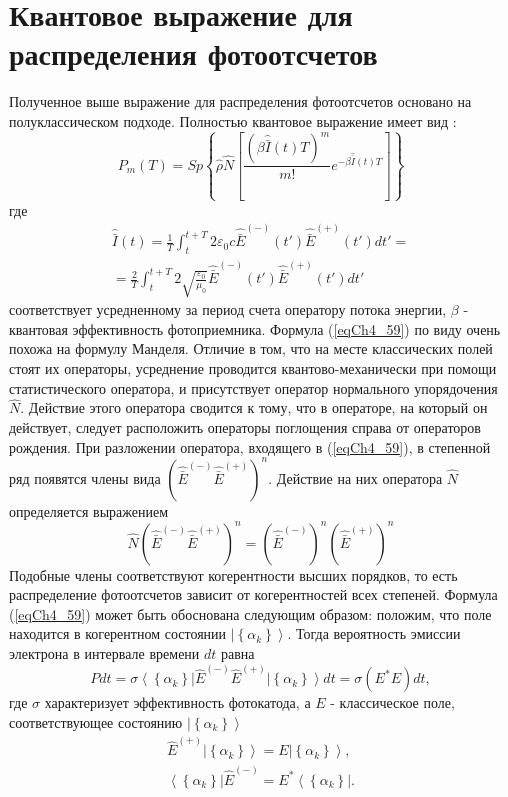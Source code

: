 \section{Квантовое выражение для распределения фотоотсчетов}
Полученное выше выражение для распределения фотоотсчетов основано на
полуклассическом подходе. Полностью квантовое выражение имеет
вид \cite{bLoudon1976}: 
\begin{equation}
P_m\left(T\right) = Sp \left\{
\hat{\rho}\hat{N}
\left[
\frac{\left(\beta \hat{\bar{I}}\left(t\right) T\right)^m}{m!}
e^{- \beta \hat{\bar{I}}\left(t\right) T}
\right]
\right\} 
\label{eqCh4_59}
\end{equation}
где
\begin{eqnarray}
\hat{\bar{I}}\left(t\right) = \frac{1}{T}\int_t^{t + T}2
\varepsilon_0 c \hat{\bar{E}}^{(-)}\left(t'\right)
\hat{\bar{E}}^{(+)}\left(t'\right)dt' =
\nonumber \\
= \frac{2}{T}\int_t^{t + T}2
\sqrt{\frac{\varepsilon_0}{\mu_0}} \hat{\bar{E}}^{(-)}\left(t'\right)
\hat{\bar{E}}^{(+)}\left(t'\right)dt'
\nonumber
\end{eqnarray}
соответствует усредненному за период счета оператору потока энергии,
$\beta$ - квантовая эффективность фотоприемника. Формула
(\ref{eqCh4_59}) по виду очень 
похожа на формулу Манделя. Отличие в том, что на месте классических
полей стоят их операторы, усреднение проводится квантово-механически
при помощи статистического оператора, и присутствует оператор
нормального упорядочения $\hat{N}$.  Действие этого оператора сводится
к тому, что в операторе, на который он действует, следует расположить 
операторы поглощения справа от операторов рождения. При разложении
оператора, входящего в (\ref{eqCh4_59}), в степенной ряд появятся
члены вида  $\left(\hat{\bar{E}}^{(-)}\hat{\bar{E}}^{(+)}\right)^n$.  
Действие на них оператора $\hat{N}$  определяется выражением 
\[
\hat{N}\left(\hat{\bar{E}}^{(-)}\hat{\bar{E}}^{(+)}\right)^n = 
\left(\hat{\bar{E}}^{(-)}\right)^n\left(\hat{\bar{E}}^{(+)}\right)^n
\]
Подобные члены соответствуют когерентности высших порядков, то есть
распределение фотоотсчетов зависит от когерентностей всех
степеней. Формула (\ref{eqCh4_59}) может быть обоснована следующим образом:
положим, что поле находится в когерентном состоянии
$\left|\left\{\alpha_k\right\}\right>$.  Тогда 
вероятность эмиссии электрона в интервале времени $dt$ равна 
\[
Pdt = \sigma
\left<\left\{\alpha_k\right\}\right|
\hat{E}^{(-)} \hat{E}^{(+)}
\left|\left\{\alpha_k\right\}\right> dt = 
\sigma \left(E^{*} E\right)dt,
\]
где $\sigma$ характеризует эффективность фотокатода, а $E$ -
классическое поле, соответствующее состоянию $\left|\left\{\alpha_k\right\}\right>$
\begin{eqnarray}
\hat{E}^{(+)} \left|\left\{\alpha_k\right\}\right> = E \left|\left\{\alpha_k\right\}\right>,
\nonumber \\
\left<\left\{\alpha_k\right\}\right|\hat{E}^{(-)} = E^{*} \left<\left\{\alpha_k\right\}\right|.
\nonumber
\end{eqnarray}

